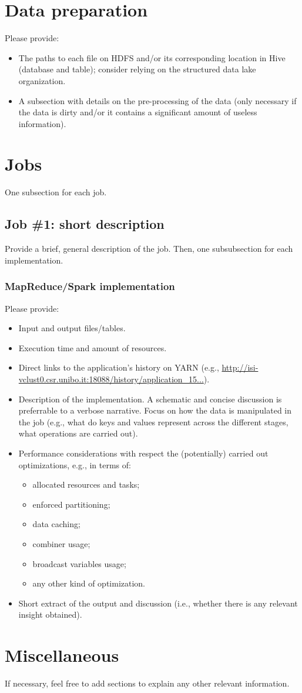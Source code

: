 \documentclass[10pt]{article}
\begin{document}
\section{Data preparation}

Please provide:
\begin{itemize}
\item The paths to each file on HDFS and/or its corresponding location in Hive (database and table); consider relying on the structured data lake organization.
\item A subsection with details on the pre-processing of the data (only necessary if the data is dirty and/or it contains a significant amount of useless information).
\end{itemize}


\section{Jobs}

One subsection for each job.

\subsection{Job \#1: short description}

Provide a brief, general description of the job. Then, one subsubsection for each implementation.

\subsubsection{MapReduce/Spark implementation}

Please provide:
\begin{itemize}
\item Input and output files/tables.
\item Execution time and amount of resources.
\item Direct links to the application's history on YARN (e.g., \url{http://isi-vclust0.csr.unibo.it:18088/history/application_15...}).
\item Description of the implementation. A schematic and concise discussion is preferrable to a verbose narrative. Focus on how the data is manipulated in the job (e.g., what do keys and values represent across the different stages, what operations are carried out). 
\item Performance considerations with respect the (potentially) carried out optimizations, e.g., in terms of:
\begin{itemize}
\item allocated resources and tasks;
\item enforced partitioning;
\item data caching;
\item combiner usage;
\item broadcast variables usage;
\item any other kind of optimization.
\end{itemize}
\item Short extract of the output and discussion (i.e., whether there is any relevant insight obtained).
\end{itemize}

\section{Miscellaneous}

If necessary, feel free to add sections to explain any other relevant information.
\end{document}
